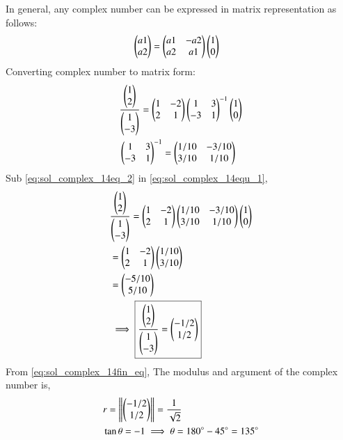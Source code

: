 In general, any complex number can be expressed in matrix representation as follows:
\begin{align}  \label{eq:sol_complex_14gen_1}
& \begin{pmatrix}a1\\ a2\end{pmatrix} = \begin{pmatrix}a1 & -a2\\ a2 & a1\end{pmatrix}\begin{pmatrix}1\\ 0\end{pmatrix}
\end{align}
Converting complex number to matrix form:
\begin{align}  
& \frac{\begin{pmatrix}1\\ 2\end{pmatrix}}{\begin{pmatrix}1\\ -3\end{pmatrix}} = \begin{pmatrix}1 & -2\\ 2 &1\end{pmatrix}\begin{pmatrix}1 & 3\\ -3 &1\end{pmatrix}^{-1}\begin{pmatrix}1\\ 0\end{pmatrix}\label{eq:sol_complex_14equ_1}\\
&\begin{pmatrix}1 & 3\\ -3 &1\end{pmatrix}^{-1} = \begin{pmatrix}1/10 & -3/10\\ 3/10 &1/10\end{pmatrix}\label{eq:sol_complex_14eq_2}
\end{align}
Sub \eqref{eq:sol_complex_14eq_2} in \eqref{eq:sol_complex_14equ_1},
\begin{align}  
& \frac{\begin{pmatrix}1\\ 2\end{pmatrix}}{\begin{pmatrix}1\\ -3\end{pmatrix}} = \begin{pmatrix}1 & -2\\ 2 &1\end{pmatrix}\begin{pmatrix}1/10 & -3/10\\ 3/10 &1/10\end{pmatrix}\begin{pmatrix}1\\ 0\end{pmatrix}\label{eq:sol_complex_14eq_3}\\
& = \begin{pmatrix}1 & -2\\ 2 &1\end{pmatrix}\begin{pmatrix}1/10\\ 3/10\end{pmatrix}\\
& = \begin{pmatrix}-5/10\\ 5/10\end{pmatrix}\\
& \implies \boxed{\frac{\begin{pmatrix}1\\ 2\end{pmatrix}}{\begin{pmatrix}1\\ -3\end{pmatrix}} = \begin{pmatrix}-1/2\\ 1/2\end{pmatrix}} \label{eq:sol_complex_14fin_eq}
\end{align}
From \eqref{eq:sol_complex_14fin_eq},
The modulus and argument of the complex number is,
\begin{align}
& r = \left\lVert\begin{pmatrix}-1/2\\ 1/2\end{pmatrix}\right\rVert = \frac{1}{\sqrt{2}}\label{eq:sol_complex_14mod}\\
& \tan\theta = -1 \implies \theta = 180^{\circ}-45^{\circ} = 135^{\circ} \label{eq:sol_complex_14arg}
\end{align}


